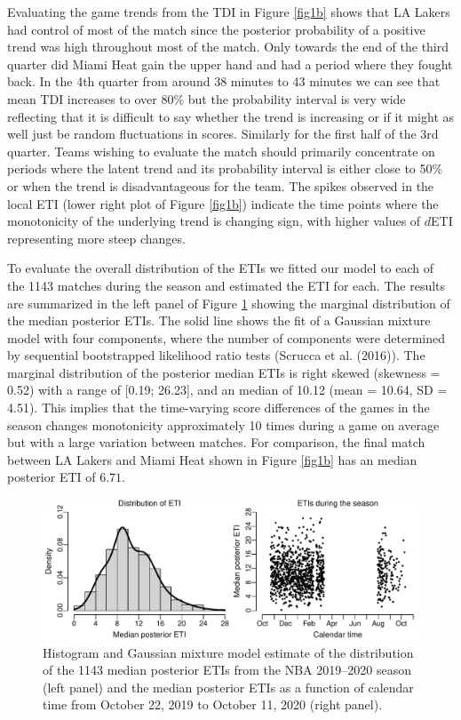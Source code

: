 \documentclass[
  11pt,
]{svjour3}
\theoremstyle{nonumberplain}
\begin{document}
Evaluating the game trends from the TDI in Figure \ref{fig1b} shows that
LA Lakers had control of most of the match since the posterior
probability of a positive trend was high throughout most of the match.
Only towards the end of the third quarter did Miami Heat gain the upper
hand and had a period where they fought back. In the 4th quarter from
around 38 minutes to 43 minutes we can see that mean TDI increases to
over 80\% but the probability interval is very wide reflecting that it
is difficult to say whether the trend is increasing or if it might as
well just be random fluctuations in scores. Similarly for the first half
of the 3rd quarter. Teams wishing to evaluate the match should primarily
concentrate on periods where the latent trend and its probability
interval is either close to 50\% or when the trend is disadvantageous
for the team. The spikes observed in the local ETI (lower right plot of
Figure \ref{fig1b}) indicate the time points where the monotonicity of
the underlying trend is changing sign, with higher values of \(d\)ETI
representing more steep changes.

To evaluate the overall distribution of the ETIs we fitted our model to
each of the 1143 matches during the season and estimated the ETI for
each. The results are summarized in the left panel of Figure \ref{fig2}
showing the marginal distribution of the median posterior ETIs. The
solid line shows the fit of a Gaussian mixture model with four
components, where the number of components were determined by sequential
bootstrapped likelihood ratio tests (Scrucca et al. (2016)). The
marginal distribution of the posterior median ETIs is right skewed
(skewness = 0.52) with a range of {[}0.19; 26.23{]}, and an median of
10.12 (mean = 10.64, SD = 4.51). This implies that the time-varying
score differences of the games in the season changes monotonicity
approximately 10 times during a game on average but with a large
variation between matches. For comparison, the final match between LA
Lakers and Miami Heat shown in Figure \ref{fig1b} has an median
posterior ETI of \(6.71\).

\begin{figure}[htbp]
\includegraphics{fig3.pdf}
\caption{Histogram and Gaussian mixture model estimate of the distribution of the 1143 median posterior ETIs from the NBA 2019--2020 season (left panel) and the median posterior ETIs as a function of calendar time from October 22, 2019 to October 11, 2020 (right panel).}
\label{fig2}
\end{figure}
\end{document}
